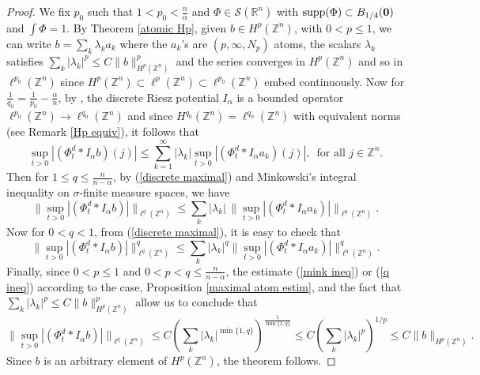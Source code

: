 \documentclass[leqno,12pt]{article} %
\newcommand\supp{\mathop{\rm supp}}
\theoremstyle{plain} %
\theoremstyle{definition} %
\begin{document}
\begin{proof}
We fix $p_0$ such that $1 < p_0 < \frac{n}{\alpha}$ and $\Phi \in \mathcal{S}(\mathbb{R}^n)$ with $\supp(\Phi) \subset B_{1/4}({\bf 0 })$ 
and $\int \Phi = 1$. By Theorem \ref{atomic Hp}, given $b \in H^{p}(\mathbb{Z}^n)$, with $0 < p \leq 1$, we can write 
$b = \sum_k \lambda_k a_k$ where the $a_k$'s are $(p, \infty, N_p)$ atoms, the scalars $\lambda_k$ satisfies 
$\sum_{k} |\lambda_k |^{p} \leq C \| b \|_{H^{p}(\mathbb{Z}^n)}^{p}$  and the series converges in $H^{p}(\mathbb{Z}^n)$ and 
so in $\ell^{p_0}(\mathbb{Z}^n)$ since $H^{p}(\mathbb{Z}^n) \subset \ell^{p}(\mathbb{Z}^n) \subset \ell^{p_0}(\mathbb{Z}^n)$ embed continuously. Now for $\frac{1}{q_0} = \frac{1}{p_0} - \frac{\alpha}{n}$, by \cite[Theorem 3.1]{PRocha}, the discrete Riesz potential 
$I_{\alpha}$ is a bounded operator $\ell^{p_0}(\mathbb{Z}^n) \to \ell^{q_0}(\mathbb{Z}^n)$ and since 
$H^{q_0}(\mathbb{Z}^{n}) = \ell^{q_0}(\mathbb{Z}^{n})$ with equivalent norms (see Remark \ref{Hp equiv}), it follows that
\begin{equation} \label{discrete maximal}
\sup_{t>0} |(\Phi_{t}^d \ast I_{\alpha}b)(j)| \leq \sum_{k=1}^{\infty} |\lambda_k| \sup_{t>0}|(\Phi_{t}^d \ast I_{\alpha} a_k)(j)|, \,\,\, \text{for all} \,\, j \in \mathbb{Z}^n.
\end{equation}
Then for $1 \leq q \leq \frac{n}{n - \alpha}$, by (\ref{discrete maximal}) and Minkowski's integral inequality on $\sigma$-finite measure spaces, we have
\begin{equation} \label{mink ineq}
\|\sup_{t>0} |(\Phi_{t}^d \ast I_{\alpha}b)| \|_{\ell^{q}(\mathbb{Z}^n)} \leq \sum_{k} |\lambda_k| \,
\| \sup_{t>0}|(\Phi_{t}^d \ast I_{\alpha} a_k)| \|_{\ell^{q}(\mathbb{Z}^n)}.
\end{equation}
Now for $0 < q < 1$, from (\ref{discrete maximal}), it is easy to check that
\begin{equation} \label{q ineq}
\| \sup_{t>0} |(\Phi_{t}^d \ast I_{\alpha}b)| \|_{\ell^{q}(\mathbb{Z}^n)}^q \leq \sum_{k} |\lambda_k|^q 
\| \sup_{t>0}|(\Phi_{t}^d \ast I_{\alpha} a_k)| \|_{\ell^{q}(\mathbb{Z}^n)}^q.
\end{equation}
Finally, since $0 < p \leq 1$ and $0 < p < q \leq \frac{n}{n - \alpha}$, the estimate (\ref{mink ineq}) or (\ref{q ineq}) according to the case, Proposition \ref{maximal atom estim}, and the fact that $\sum_{k} |\lambda_k |^{p} \leq C \| b \|_{H^{p}(\mathbb{Z}^n)}^{p}$  allow us to conclude that 
\[
\|\sup_{t>0}|(\Phi_{t}^d \ast I_{\alpha} b)| \|_{\ell^{q}(\mathbb{Z}^n)} \leq C \left( \sum_{k} |\lambda_k|^{\min\{1, q \}} \right)^{\frac{1}{\min\{1, q \}}} \leq C \left( \sum_{k} |\lambda_k |^{p} \right)^{1/p} \leq C\| b \|_{H^{p}(\mathbb{Z}^n)}.
\] 
Since $b$ is an arbitrary element of $H^{p}(\mathbb{Z}^n)$, the theorem follows.
\end{proof}
\end{document}
